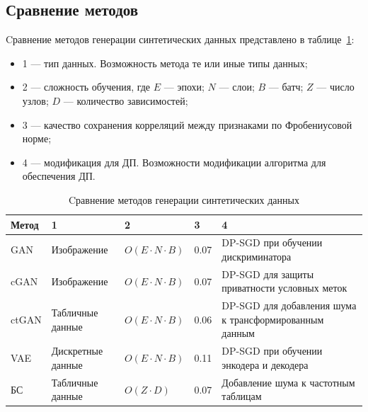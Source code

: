 

\subsection{Сравнение методов}

Cравнение методов генерации синтетических данных представлено в таблице~\ref{tab:my_table_label}:

\begin{itemize}[label*=---]
	\item 1 --- тип данных. Возможность метода те или иные типы данных;
	\item 2 --- сложность обучения, где $E$ --- эпохи; $N$ --- слои; $B$ --- батч; $Z$ --- число узлов; $D$ --- количество зависимостей;
	\item 3 --- качество сохранения корреляций между признаками по Фробениусовой норме;
	\item 4 --- модификация для ДП. Возможности модификации алгоритма для обеспечения ДП.
\end{itemize}

\newpage
\begin{table}[ht]
	\centering
	\captionsetup{justification=raggedleft}
	\caption{Cравнение методов генерации синтетических данных}
	\label{tab:my_table_label}
\begin{tabularx}{\textwidth}{|X|X|X|X|X|}
	\hline
	Метод & 1 & 2 & 3 & 4\\
	\hline
	GAN & Изображение & $O(E \cdot N \cdot B)$  & 0.07 & DP-SGD при обучении дискриминатора \\
	\hline
	cGAN & Изображение & $O(E \cdot N \cdot B)$ & 0.07  &  DP-SGD для защиты приватности условных меток \\
	\hline
	ctGAN & Табличные данные & $O(E \cdot N \cdot B)$  & 0.06 & DP-SGD для добавления шума к трансформированным данным \\
	\hline
	VAE & Дискретные данные & $O(E \cdot N \cdot B)$ & 0.11 & DP-SGD при обучении энкодера и декодера \\
	\hline
	БС & Табличные данные & $O(Z \cdot D )$ & 0.07 & Добавление шума к частотным таблицам\\
	\hline
\end{tabularx}
\end{table}

